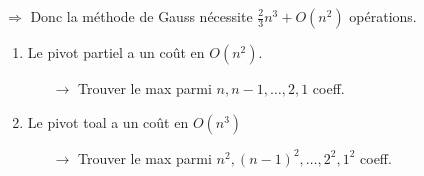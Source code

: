 $\Rightarrow$ Donc la méthode de Gauss nécessite $\frac{2}{3}n^3+O(n^2)$ opérations.

\vspace{0.5cm}
\begin{remark}
    \begin{enumerate}
        \item Le pivot partiel a un coût en $O(n^2)$.
            \begin{itemize}
                \item [$\rightarrow$] Trouver le max parmi $n,n-1, \dots, 2, 1$ coeff.
            \end{itemize}

        \item Le pivot toal a un coût en $O(n^3)$
            \begin{itemize}
                \item [$\rightarrow$] Trouver le max parmi $n^2, (n-1)^2, \dots , 2^2, 1^2$ coeff.
            \end{itemize}
    \end{enumerate}
\end{remark}





